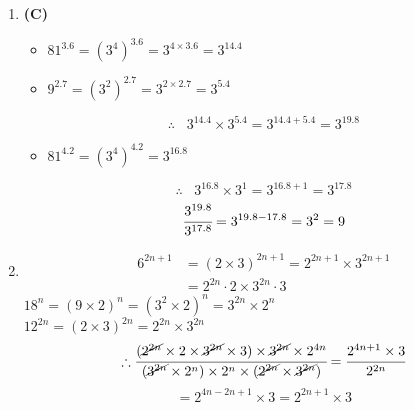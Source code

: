 \begin{multicols}{2}
\begin{enumerate}[label={\arabic*.}]
    \item \textbf{(C)}
        \begin{itemize} 
        \item \( 81^{3.6} = (3^4)^{3.6} = 3^{4 \times 3.6} = 3^{14.4} \)
        \item \( 9^{2.7} = (3^2)^{2.7} = 3^{2 \times 2.7} = 3^{5.4} \)
        \end{itemize}
        \[\therefore \hspace{10pt} 3^{14.4} \times 3^{5.4} = 3^{14.4 + 5.4} = 3^{19.8}\]
        \begin{itemize} 
        \item \( 81^{4.2} = (3^4)^{4.2} = 3^{16.8} \)
        \end{itemize}
        \[\therefore \hspace{10pt} 3^{16.8} \times 3^{1} = 3^{16.8 + 1} = 3^{17.8}\]
        \[\cfrac{3^{19.8}}{3^{17.8}} = 3^{19.8 - 17.8} = 3^2 = 9\]

    \item
        \begin{align*}
        6^{2n + 1} &= (2 \times 3)^{2n + 1} = 2^{2n + 1} \times 3^{2n + 1} \\
            &= 2^{2n} \cdot 2 \times 3^{2n} \cdot 3
        \end{align*}
        \( 18^n = (9 \times 2)^n = (3^2 \times 2)^n = 3^{2n} \times 2^n \) \\
        \( 12^{2n} = (2 \times 3)^{2n} = 2^{2n} \times 3^{2n} \)
        \[\therefore \cfrac{(\cancel{2^{2n}} \times 2 \times \cancel{3^{2n}} \times 3) \times \cancel{3^{2n}} \times 2^{4n}}{(\cancel{3^{2n}} \times 2^n) \times 2^n \times (\cancel{2^{2n}} \times \cancel{3^{2n}})} = \cfrac{2^{4n + 1} \times 3}{2^{2n}}\]
        \[= 2^{4n - 2n + 1} \times 3 = 2^{2n + 1} \times 3\]


\end{enumerate}
\end{multicols}
